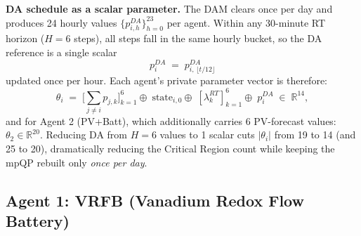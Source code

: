 \documentclass[11pt, letterpaper]{article}
\begin{document}
\textbf{DA schedule as a scalar parameter.}
The DAM clears once per day and produces 24 hourly values $\{p^{DA}_{i,h}\}_{h=0}^{23}$ per agent.  Within any 30-minute RT horizon ($H=6$ steps), all steps fall in the same hourly bucket, so the DA reference is a single scalar
\[
  p^{DA}_{i} \;=\; p^{DA}_{i,\,\lfloor t/12 \rfloor}
\]
updated once per hour.  Each agent's private parameter vector is therefore:
\[
  \theta_i \;=\; \bigl[\textstyle\sum_{j\ne i}p_{j,k}\bigr]_{k=1}^{6}
              \oplus\; \text{state}_{i,0}
              \oplus\; [\lambda^{RT}_k]_{k=1}^{6}
              \oplus\; p^{DA}_{i}
              \;\in\; \mathbb{R}^{14},
\]
and for Agent 2 (PV+Batt), which additionally carries 6 PV-forecast values: $\theta_2 \in \mathbb{R}^{20}$.  Reducing DA from $H=6$ values to 1 scalar cuts $|\theta_i|$ from 19 to 14 (and 25 to 20), dramatically reducing the Critical Region count while keeping the mpQP rebuilt only \emph{once per day}.

\subsection{Agent 1: VRFB (Vanadium Redox Flow Battery)}
\end{document}
